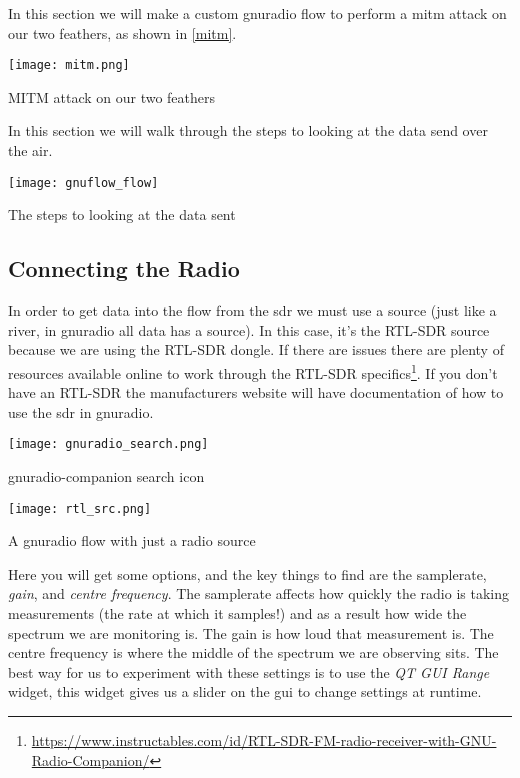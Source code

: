 In this section we will make a custom gnuradio flow to perform a \gls{mitm} attack on our two feathers, as shown in \cref{mitm}.

\centrefigurestart
\texttt{[image: mitm.png]}
\caption{MITM attack on our two feathers}
\label{mitm}
\centrefigureend

In this section we will walk through the steps to looking at the data send over the air.

\centrefigurestart
\texttt{[image: gnuflow\_flow]}
\caption{The steps to looking at the data sent}
\label{mitm}
\centrefigureend


\subsection{Connecting the Radio}
In order to get data into the flow from the \gls{sdr} we must use a \gls{source} (just like a river, in gnuradio all data has a source). In this case, it's the RTL-SDR \gls{source} because we are using the RTL-SDR dongle. If there are issues there are plenty of resources available online to work through the RTL-SDR specifics\footnote{\url{https://www.instructables.com/id/RTL-SDR-FM-radio-receiver-with-GNU-Radio-Companion/}}. If you don't have an RTL-SDR the manufacturers website will have documentation of how to use the \gls{sdr} in gnuradio.


\centrefigurestart
\texttt{[image: gnuradio\_search.png]}
\caption{gnuradio-companion search icon}
\label{gnufind}
\centrefigureend


\centrefigurestart
\texttt{[image: rtl\_src.png]}
\caption{A gnuradio flow with just a radio source}
\label{gnusource}
\centrefigureend


Here you will get some options, and the key things to find are the \gls{samplerate}, \textit{gain}, and \textit{centre frequency}. The \gls{samplerate} affects how quickly the radio is taking measurements (the rate at which it samples!) and as a result how wide the spectrum we are monitoring is. The gain is how loud that measurement is. The centre frequency is where the middle of the spectrum we are observing sits. The best way for us to experiment with these settings is to use the \textit{QT GUI Range} widget, this widget gives us a slider on the \gls{gui} to change settings at runtime. 

